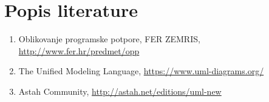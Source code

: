 \chapter*{Popis literature}
		
		\begin{enumerate}
			
			
			\item  Oblikovanje programske potpore, FER ZEMRIS, \url{http://www.fer.hr/predmet/opp}

			\item  The Unified Modeling Language, \url{https://www.uml-diagrams.org/}
			
			\item  Astah Community, \url{http://astah.net/editions/uml-new}
		\end{enumerate}
		
		 